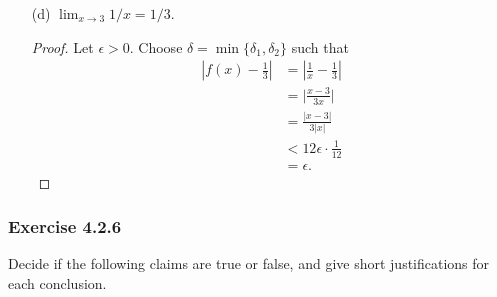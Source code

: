 \begin{enumerate}
\begin{proof}
\begin{align*}
                          &< | x+3  | \delta \\
                          &< 3 \cdot \frac{ \epsilon  }{ 3 } .
                          &= \epsilon.
        \end{align*}
        \end{proof}
    \item[(d)] \( \lim_{ x \to 3 } 1/x = 1/3.\)
        \begin{proof}
        Let \( \epsilon > 0  \). Choose \( \delta = \min \{ \delta_1, \delta_2 \}  \) such that 
        \begin{align*}
            | f(x) - \frac{ 1 }{ 3 }  | &= | \frac{ 1 }{ x }  - \frac{ 1 }{ 3 }  |  \\
                                        &= \Big| \frac{ x - 3  }{ 3x }  \Big| \\
    &= \frac{ | x - 3  |  }{ 3| x |  } \\ 
    &< 12 \epsilon \cdot \frac{ 1 }{ 12 } \\
    &= \epsilon.
        \end{align*}
        \end{proof}
\end{enumerate}




\subsubsection{Exercise 4.2.6} Decide if the following claims are true or false, and give short justifications for each conclusion.

